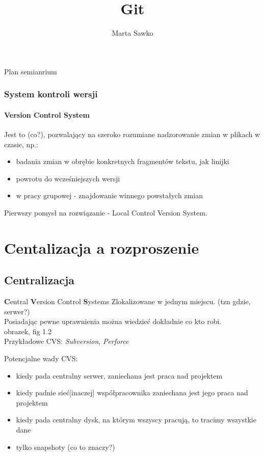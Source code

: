 \documentclass{beamer}
\title{Git}
\author{Marta Sawko}
\begin{document}
\frame{\titlepage}
\begin{frame}{Plan semianrium}
  \tableofcontents[hidesubsections]
\end{frame}

\begin{frame}
 \frametitle{System kontroli wersji}
 \framesubtitle{\textbf{V}ersion \textbf{C}ontrol \textbf{S}ystem}
 Jest to (co?), pozwalający na szeroko rozumiane nadzorowanie zmian w plikach w czasie, np.:
 \begin{itemize}
  \item badania zmian w obrębie konkretnych fragmentów tekstu, jak linijki
  \item powrotu do wcześniejszych wersji 
  \item w pracy grupowej - znajdowanie winnego powstałych zmian
 \end{itemize} 
 Pierwszy pomysł na rozwiązanie - Local Control Version System.
\end{frame}

\section{Centalizacja a rozproszenie}
\subsection{Centralizacja}
\begin{frame}{\textbf{C}entral \textbf{V}ersion Control \textbf{S}ystems}
  Zlokalizowane w jednym miejscu. (tzn gdzie, serwer?) \\
  Posiadając pewne uprawnienia można wiedzieć dokładnie co kto robi.\\
  obrazek, fig 1.2
  \\ Przykładowe CVS\@: \textit{Subversion}, \textit{Perforce}
\end{frame}

\begin{frame}
  Potencjalne wady CVS:
  \begin{itemize}
  \item kiedy pada centralny serwer, zaniechana jest praca nad projektem
  \item kiedy padnie sieć[inaczej] współpracownika zaniechana jest jego praca nad projektem
  \item kiedy pada centralny dysk, na którym wszyscy pracują, to tracimy wszystkie dane 
  \item tylko snapshoty (co to znaczy?)
 \end{itemize}
\end{frame}
\end{document}
